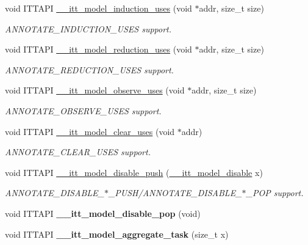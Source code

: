 \begin{DoxyCompactItemize}
\item 
void I\+T\+T\+A\+P\+I \hyperlink{group__model_gaf8d22f3fc7e8c30ff185735852ff728f}{\+\_\+\+\_\+itt\+\_\+model\+\_\+induction\+\_\+uses} (void $\ast$addr, size\+\_\+t size)
\begin{DoxyCompactList}\small\item\em A\+N\+N\+O\+T\+A\+T\+E\+\_\+\+I\+N\+D\+U\+C\+T\+I\+O\+N\+\_\+\+U\+S\+E\+S support. \end{DoxyCompactList}\item 
void I\+T\+T\+A\+P\+I \hyperlink{group__model_ga49bb058451c4b6b44ff26f1d5ee9b2cc}{\+\_\+\+\_\+itt\+\_\+model\+\_\+reduction\+\_\+uses} (void $\ast$addr, size\+\_\+t size)
\begin{DoxyCompactList}\small\item\em A\+N\+N\+O\+T\+A\+T\+E\+\_\+\+R\+E\+D\+U\+C\+T\+I\+O\+N\+\_\+\+U\+S\+E\+S support. \end{DoxyCompactList}\item 
void I\+T\+T\+A\+P\+I \hyperlink{group__model_ga54ad5dad8921751223d07ac65c651d9b}{\+\_\+\+\_\+itt\+\_\+model\+\_\+observe\+\_\+uses} (void $\ast$addr, size\+\_\+t size)
\begin{DoxyCompactList}\small\item\em A\+N\+N\+O\+T\+A\+T\+E\+\_\+\+O\+B\+S\+E\+R\+V\+E\+\_\+\+U\+S\+E\+S support. \end{DoxyCompactList}\item 
void I\+T\+T\+A\+P\+I \hyperlink{group__model_ga5233fcd88ce2279d95bbc02c0bc1419b}{\+\_\+\+\_\+itt\+\_\+model\+\_\+clear\+\_\+uses} (void $\ast$addr)
\begin{DoxyCompactList}\small\item\em A\+N\+N\+O\+T\+A\+T\+E\+\_\+\+C\+L\+E\+A\+R\+\_\+\+U\+S\+E\+S support. \end{DoxyCompactList}\item 
void I\+T\+T\+A\+P\+I \hyperlink{group__model_ga8b1f02078fd0d9c95c18b2f51a2020db}{\+\_\+\+\_\+itt\+\_\+model\+\_\+disable\+\_\+push} (\hyperlink{group__model_ga1202045d9271afd9f59f323a9fe30622}{\+\_\+\+\_\+itt\+\_\+model\+\_\+disable} x)
\begin{DoxyCompactList}\small\item\em A\+N\+N\+O\+T\+A\+T\+E\+\_\+\+D\+I\+S\+A\+B\+L\+E\+\_\+$\ast$\+\_\+\+P\+U\+S\+H/\+A\+N\+N\+O\+T\+A\+T\+E\+\_\+\+D\+I\+S\+A\+B\+L\+E\+\_\+$\ast$\+\_\+\+P\+O\+P support. \end{DoxyCompactList}\item 
\hypertarget{group__model_gae0fa340a8815b1e4d29d7e8c59fa652a}{}void I\+T\+T\+A\+P\+I {\bfseries \+\_\+\+\_\+itt\+\_\+model\+\_\+disable\+\_\+pop} (void)\label{group__model_gae0fa340a8815b1e4d29d7e8c59fa652a}

\item 
\hypertarget{group__model_gac165f33832cb92943a702e083fc4f637}{}void I\+T\+T\+A\+P\+I {\bfseries \+\_\+\+\_\+itt\+\_\+model\+\_\+aggregate\+\_\+task} (size\+\_\+t x)\label{group__model_gac165f33832cb92943a702e083fc4f637}

\end{DoxyCompactItemize}



